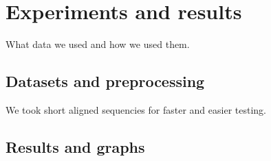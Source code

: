 \chapter{Experiments and results}

\label{kap:experiments} %

What data we used and how we used them.

\section{Datasets and preprocessing}

We took short aligned sequencies for faster and easier testing.

\section{Results and graphs}
